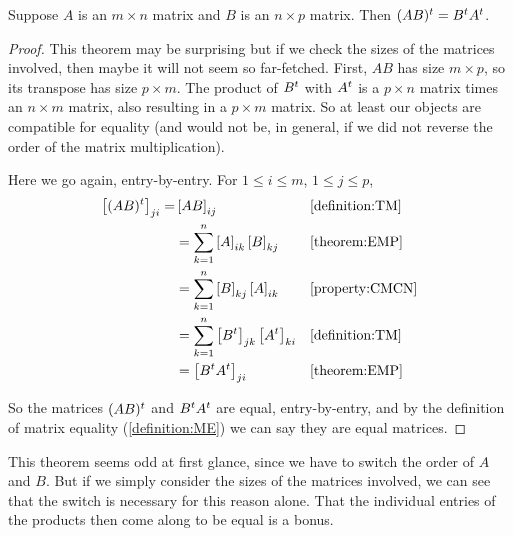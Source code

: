 \documentclass{ximera}
\begin{document}
\begin{theorem}
\label{theorem:MMT}

Suppose $A$ is an $m\times n$ matrix and $B$ is an $n\times p$ matrix.  Then $(AB)^{t}=B^{t}A^{t}$.

\begin{proof}
  This theorem may be surprising but if we check the sizes of the
  matrices involved, then maybe it will not seem so far-fetched.
  First, $AB$ has size $m\times p$, so its transpose has size
  $p\times m$.  The product of $B^{t}$ with $A^{t}$ is
  a $p\times n$ matrix times an $n\times m$ matrix, also resulting in
  a $p\times m$ matrix.  So at least our objects are compatible for
  equality (and would not be, in general, if we did not reverse the
  order of the matrix multiplication).

  Here we go again, entry-by-entry.  For $1\leq i\leq m$, $1\leq j\leq p$,
  \begin{align*}
    \left\lbrack(AB)^{t}\right\rbrack_{ji}=&\left\lbrack AB\right\rbrack_{ij}
    &&\ref{definition:TM}\\
                                       &=\sum_{k=1}^{n}\left\lbrack A\right\rbrack_{ik}\left\lbrack B\right\rbrack_{kj}
    &&\ref{theorem:EMP}\\
                                       &=\sum_{k=1}^{n}\left\lbrack B\right\rbrack_{kj}\left\lbrack A\right\rbrack_{ik}
    &&\ref{property:CMCN}\\
                                       &=\sum_{k=1}^{n}\left\lbrack B^{t}\right\rbrack_{jk}\left\lbrack A^{t}\right\rbrack_{ki}
    &&\ref{definition:TM}\\
                                       &=\left\lbrack B^{t}A^{t}\right\rbrack_{ji}
    &&\ref{theorem:EMP}
  \end{align*}
  
  So the matrices $(AB)^{t}$ and $B^{t}A^{t}$
  are equal, entry-by-entry, and by the definition of matrix equality
  (\ref{definition:ME}) we can say they are equal matrices.

\end{proof}
\end{theorem}

This theorem seems odd at first glance, since we have to switch the order of $A$ and $B$.  But if we simply consider the sizes of the matrices involved, we can see that the switch is necessary for this reason alone.  That the individual entries of the products then come along to be equal is a bonus.
\end{document}
